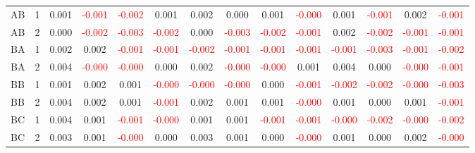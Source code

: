 \begin{table}[!htb]
{\begin{tabular}{llcccccccccccc}
AB & 1 & 0.001 & \textcolor{red}{-0.001} & \textcolor{red}{-0.002} & 0.001 & 0.002 & 0.000 & 0.001 & \textcolor{red}{-0.000} & 0.001 & \textcolor{red}{-0.001} & 0.002 & \textcolor{red}{-0.001}\\
AB & 2 & 0.000 & \textcolor{red}{-0.002} & \textcolor{red}{-0.003} & \textcolor{red}{-0.002} & 0.000 & \textcolor{red}{-0.003} & \textcolor{red}{-0.002} & \textcolor{red}{-0.001} & 0.002 & \textcolor{red}{-0.002} & \textcolor{red}{-0.001} & \textcolor{red}{-0.001}\\
BA & 1 & 0.002 & 0.002 & \textcolor{red}{-0.001} & \textcolor{red}{-0.001} & \textcolor{red}{-0.002} & \textcolor{red}{-0.001} & \textcolor{red}{-0.001} & \textcolor{red}{-0.001} & \textcolor{red}{-0.001} & \textcolor{red}{-0.003} & \textcolor{red}{-0.001} & \textcolor{red}{-0.002}\\
BA & 2 & 0.004 & \textcolor{red}{-0.000} & \textcolor{red}{-0.000} & 0.000 & 0.002 & \textcolor{red}{-0.000} & \textcolor{red}{-0.000} & 0.001 & 0.004 & 0.000 & \textcolor{red}{-0.000} & \textcolor{red}{-0.001}\\
BB & 1 & 0.001 & 0.002 & 0.001 & \textcolor{red}{-0.000} & \textcolor{red}{-0.000} & \textcolor{red}{-0.000} & 0.000 & \textcolor{red}{-0.001} & \textcolor{red}{-0.002} & \textcolor{red}{-0.002} & \textcolor{red}{-0.000} & \textcolor{red}{-0.003}\\
BB & 2 & 0.004 & 0.002 & 0.001 & \textcolor{red}{-0.001} & 0.002 & 0.001 & 0.001 & \textcolor{red}{-0.000} & 0.001 & 0.000 & 0.001 & \textcolor{red}{-0.001}\\
BC & 1 & 0.004 & 0.001 & \textcolor{red}{-0.001} & \textcolor{red}{-0.000} & 0.001 & 0.001 & \textcolor{red}{-0.001} & \textcolor{red}{-0.001} & \textcolor{red}{-0.000} & \textcolor{red}{-0.002} & \textcolor{red}{-0.000} & \textcolor{red}{-0.002}\\
BC & 2 & 0.003 & 0.001 & \textcolor{red}{-0.000} & 0.000 & 0.003 & 0.001 & 0.000 & \textcolor{red}{-0.000} & 0.001 & 0.000 & 0.002 & \textcolor{red}{-0.000}\\
\hline
    \end{tabular}%
    }
\end{table}

